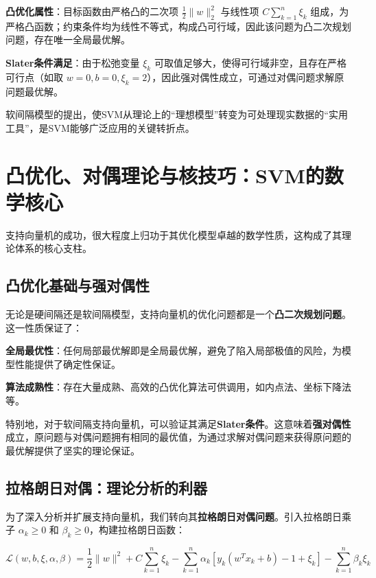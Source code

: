 \documentclass{article}
\newenvironment{solution_cn}{%
  \begin{proof}[解答]%
}{%
  \end{proof}%
}
\begin{document}
\begin{solution_cn}
\textbf{凸优化属性}：目标函数由严格凸的二次项 $ \frac{1}{2} \|w\|_2^2 $ 与线性项 $ C \sum_{k=1}^n \xi_k $ 组成，为严格凸函数；约束条件均为线性不等式，构成凸可行域，因此该问题为凸二次规划问题，存在唯一全局最优解。

\textbf{Slater条件满足}：由于松弛变量 $ \xi_k $ 可取值足够大，使得可行域非空，且存在严格可行点（如取 $ w=0, b=0, \xi_k=2 $），因此强对偶性成立，可通过对偶问题求解原问题最优解。

软间隔模型的提出，使SVM从理论上的“理想模型”转变为可处理现实数据的“实用工具”，是SVM能够广泛应用的关键转折点。

\section{凸优化、对偶理论与核技巧：SVM的数学核心}

支持向量机的成功，很大程度上归功于其优化模型卓越的数学性质，这构成了其理论体系的核心支柱。

\subsection{凸优化基础与强对偶性}

无论是硬间隔还是软间隔模型，支持向量机的优化问题都是一个\textbf{凸二次规划问题}。这一性质保证了：

\textbf{全局最优性}：任何局部最优解即是全局最优解，避免了陷入局部极值的风险，为模型性能提供了确定性保证。

\textbf{算法成熟性}：存在大量成熟、高效的凸优化算法可供调用，如内点法、坐标下降法等。

特别地，对于软间隔支持向量机，可以验证其满足\textbf{Slater条件}。这意味着\textbf{强对偶性}成立，原问题与对偶问题拥有相同的最优值，为通过求解对偶问题来获得原问题的最优解提供了坚实的理论保证。

\subsection{拉格朗日对偶：理论分析的利器}

为了深入分析并扩展支持向量机，我们转向其\textbf{拉格朗日对偶问题}。引入拉格朗日乘子 $\alpha_k \geq 0$ 和 $\beta_k \geq 0$，构建拉格朗日函数：

\begin{equation}
\mathcal{L}(w,b,\xi,\alpha,\beta) = \frac{1}{2} \|w\|^2 + C\sum_{k=1}^n \xi_k - \sum_{k=1}^n \alpha_k[y_k(w^T x_k + b) - 1 + \xi_k] - \sum_{k=1}^n \beta_k \xi_k
\end{equation}


\end{solution_cn}
\end{document}

